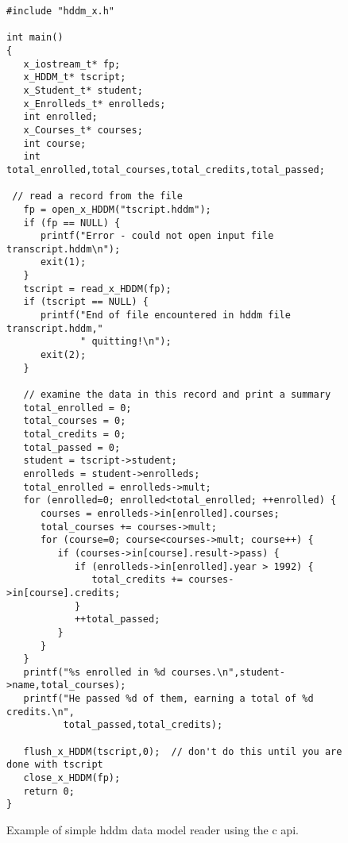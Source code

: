 \documentclass{revtex4}
\begin{document}
\begin{figure}
\begin{minipage}{12cm}
\begin{verbatim}
#include "hddm_x.h"

int main()
{
   x_iostream_t* fp;
   x_HDDM_t* tscript;
   x_Student_t* student;
   x_Enrolleds_t* enrolleds;
   int enrolled;
   x_Courses_t* courses;
   int course;
   int total_enrolled,total_courses,total_credits,total_passed;

 // read a record from the file
   fp = open_x_HDDM("tscript.hddm");
   if (fp == NULL) {
      printf("Error - could not open input file transcript.hddm\n");
      exit(1);
   }
   tscript = read_x_HDDM(fp);
   if (tscript == NULL) {
      printf("End of file encountered in hddm file transcript.hddm,"
             " quitting!\n");
      exit(2);
   }

   // examine the data in this record and print a summary
   total_enrolled = 0;
   total_courses = 0;
   total_credits = 0;
   total_passed = 0;
   student = tscript->student;
   enrolleds = student->enrolleds;
   total_enrolled = enrolleds->mult;
   for (enrolled=0; enrolled<total_enrolled; ++enrolled) {
      courses = enrolleds->in[enrolled].courses;
      total_courses += courses->mult;
      for (course=0; course<courses->mult; course++) {
         if (courses->in[course].result->pass) {
            if (enrolleds->in[enrolled].year > 1992) {
               total_credits += courses->in[course].credits;
            }
            ++total_passed;
         }
      }
   }
   printf("%s enrolled in %d courses.\n",student->name,total_courses);
   printf("He passed %d of them, earning a total of %d credits.\n",
          total_passed,total_credits);

   flush_x_HDDM(tscript,0);  // don't do this until you are done with tscript
   close_x_HDDM(fp);
   return 0;
}
\end{verbatim}
\end{minipage}
\caption{\label{reader_ex1}
Example of simple hddm data model reader using the c api.
}
\end{figure}
\end{document}
